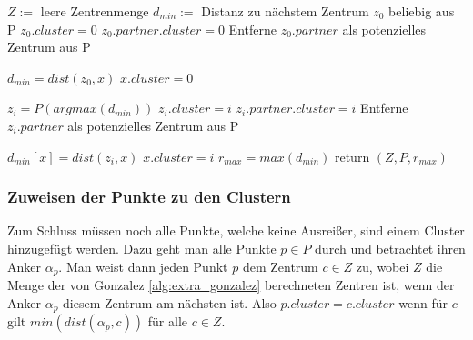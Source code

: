         
            \begin{algorithm}
                \caption{Gonzalez-Algorithmus mit Fairlets}\label{alg:extra_gonzalez}
                \begin{algorithmic}[1]
                        \State $Z := $ leere Zentrenmenge
                        \State $d_{min} := $ Distanz zu nächstem Zentrum 
                        \State $z_0$ beliebig aus P
                        \State $z_0.cluster = 0$
                        \State $z_0.partner.cluster = 0$    
                        \State Entferne $z_0.partner$ als potenzielles Zentrum aus P 
                        \State

                            \State $d_{min} = dist(z_0, x)$
                            \State $x.cluster = 0$
                        \EndFor
                        \State
                        
                            \State $z_i = P(argmax(d_{min}))$
                            \State $z_i.cluster = i$
                            \State $z_i.partner.cluster = i$    
                        \State Entferne $z_i.partner$ als potenzielles Zentrum aus P 
        
                                    \State $d_{min}[x] = dist(z_i, x)$
                                    \State $x.cluster = i$
                                \EndIf
                            \EndFor
                        \EndFor
                        \State $r_{max} = max(d_{min})$
                        \State return $(Z, P, r_{max})$  
                    \EndFunction
                \end{algorithmic}
            \end{algorithm}

        \subsubsection{Zuweisen der Punkte zu den Clustern}
            Zum Schluss müssen noch alle Punkte, welche keine Ausreißer, sind einem Cluster hinzugefügt werden. Dazu geht man alle Punkte $p \in P$ durch und betrachtet ihren Anker $\alpha_p$. Man weist dann jeden Punkt $p$ dem Zentrum $c \in Z$ zu, wobei $Z$ die Menge der von Gonzalez \ref{alg:extra_gonzalez} berechneten Zentren ist, wenn der Anker $\alpha_p$ diesem Zentrum am nächsten ist. Also $p.cluster = c.cluster $ wenn für $c$ gilt $min(dist(\alpha_p, c)) $ für alle $ c \in Z$.

